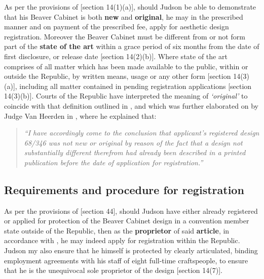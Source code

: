 \documentclass[11pt]{article}
\begin{document}
As per the provisions of [section 14(1)(a)]\cite{rsa93_designs_act}, should Judson
be able to demonstrate that his Beaver Cabinet is both \textbf{new} and \textbf{original}, he
may in the prescribed manner and on payment of the prescribed fee, apply for
aesthetic design registration. Moreover the Beaver Cabinet must be different
from or not form part of the \textbf{state of the art} within a grace period of six
months from the date of first disclosure, or release date [section
14(2)(b)]\cite{rsa93_designs_act}. Where state of the art comprises of all matter
which has been made available to the public, within or outside the Republic, by
written means, usage or any other form [section 14(3)(a)]\cite{rsa93_designs_act},
including all matter contained in pending registration applications [section
14(3)(b)]\cite{rsa93_designs_act}. Courts of the Republic have interpreted the
meaning of \emph{`original'} to coincide with that definition outlined in
\cite{rsa78_copyrightact}, and which was further elaborated on by Judge Van
Heerden in , where he
explained that:
\begin{quote}
\textit{``I have accordingly come to the conclusion that applicant's registered design
68/346 was not new or original by reason of the fact that a design not substantially
different therefrom had already been described in a printed publication before the
date of application for registration.''}
\end{quote}

\subsection{Requirements and procedure for registration}
\label{sec:org4c873b9}
As per the provisions of [section 44]\cite{rsa93_designs_act}, should Judson have
either already registered or applied for protection of the Beaver Cabinet design
in a convention member state outside of the Republic, then as the \textbf{proprietor}
of said \textbf{article}, in accordance with \cite{rsa93_designs_act}, he may indeed
apply for registration within the Republic. Judson my also ensure that he
himself is protected by clearly articulated, binding employment agreements with
his staff of eight full-time craftspeople, to ensure that he is the unequivocal
sole proprietor of the design [section 14(7)]\cite{rsa93_designs_act}.\\
\end{document}
